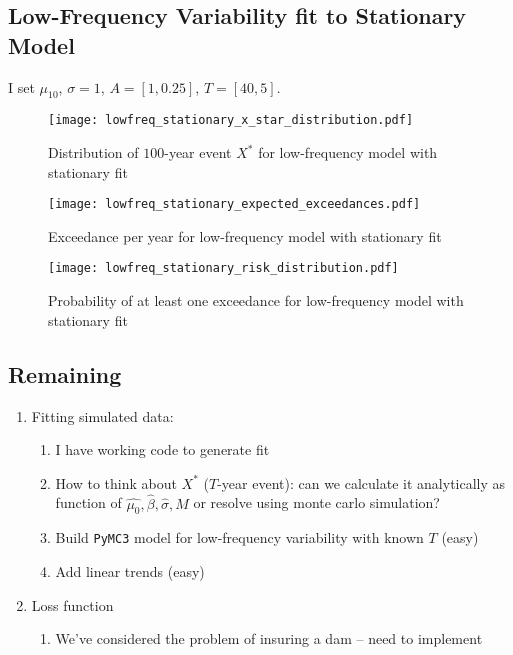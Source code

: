 \subsection{Low-Frequency Variability fit to Stationary Model}
I set $\mu_10$, $\sigma=1$, $A=[1, 0.25]$, $T=[40, 5]$.
\begin{figure}[ht]
  \centering
  \texttt{[image: lowfreq\_stationary\_x\_star\_distribution.pdf]}
  \caption{Distribution of $100$-year event $X^*$ for low-frequency model with stationary fit}
\end{figure}
\begin{figure}[ht]
  \centering
  \texttt{[image: lowfreq\_stationary\_expected\_exceedances.pdf]}
  \caption{Exceedance per year for low-frequency model with stationary fit}
\end{figure}
\begin{figure}[ht]
  \centering
  \texttt{[image: lowfreq\_stationary\_risk\_distribution.pdf]}
  \caption{Probability of at least one exceedance for low-frequency model with stationary fit}
\end{figure}

\subsection{Remaining}

\begin{enumerate}
  \item Fitting simulated data:
  \begin{enumerate}
    \item I have working code to generate fit
    \item How to think about $X^*$ ($T$-year event): can we calculate it analytically as function of $\hat{\mu_0},\hat{\beta},\hat{\sigma},M$ or resolve using monte carlo simulation?
    \item Build \texttt{PyMC3} model for low-frequency variability with known $T$ (easy)
    \item Add linear trends (easy)
  \end{enumerate}
  \item Loss function
  \begin{enumerate}
    \item We've considered the problem of insuring a dam -- need to implement
  \end{enumerate}
\end{enumerate}
